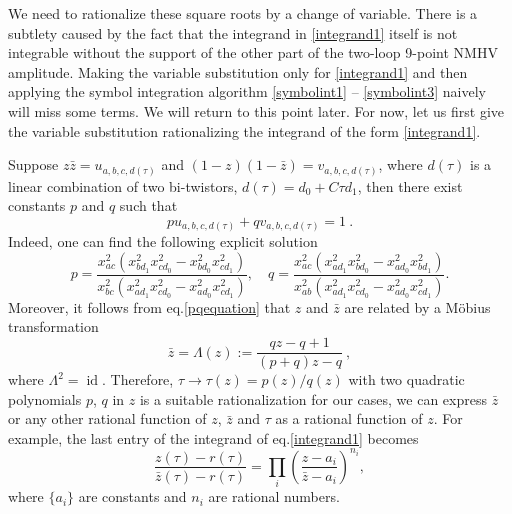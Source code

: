 \documentclass[a4paper,12pt]{article}
\begin{document}
We need to rationalize these square roots by a change of variable. There is a subtlety caused by the fact that the integrand in \eqref{integrand1} itself is not integrable without the support of the other part of the two-loop 9-point NMHV amplitude. Making the variable substitution only for \eqref{integrand1} and then applying the symbol integration algorithm \eqref{symbolint1} -- \eqref{symbolint3} naively will miss some terms. We will return to this point later. For now, let us first give the variable substitution rationalizing the integrand of the form \eqref{integrand1}.

Suppose $z\bar z=u_{a,b,c,d(\tau)}$ and $(1-z)(1-\bar z)=v_{a,b,c,d(\tau)}$, where $d(\tau)$ is a linear combination of two bi-twistors, $d(\tau)=d_0+C\tau d_1$, then there exist constants $p$ and $q$ such that
\begin{equation}
pu_{a,b,c,d(\tau)}+qv_{a,b,c,d(\tau)}=1 \:. \label{pqequation}
\end{equation}
Indeed, one can find the following explicit solution
\[
p=\frac{x_{ac}^2 (x_{bd_1}^2 x_{cd_0}^2- x_{bd_0}^2 x_{cd_1}^2)}{x_{bc}^2(x_{ad_1}^2  x_{cd_0}^2-x_{ad_0}^2  x_{cd_1}^2)},\quad q=\frac{x_{ac}^2(x_{ad_1}^2 x_{bd_0}^2-x_{ad_0}^2 x_{bd_1}^2)}{x_{ab}^2 (x_{ad_1}^2 x_{cd_0}^2-x_{ad_0}^2  x_{cd_1}^2)}.
\]
Moreover, it follows from eq.\eqref{pqequation} that $z$ and $\bar{z}$ are related by a M\"obius transformation 
\[
\bar z=\Lambda(z):=\frac{q z-q+1}{(p +q) z-q} \:,
\]
where $\Lambda^2=\operatorname{id}$. Therefore, $\tau\to \tau(z)=p(z)/q(z)$ with two quadratic polynomials $p$, $q$ in $z$ is a suitable rationalization for our cases, we can express $\bar z$ or any other rational function of $z$, $\bar z$ and $\tau$ as a rational function of $z$. For example, the last entry of the integrand of eq.\eqref{integrand1} becomes
\[
\frac{z(\tau)-r(\tau)}{\bar z(\tau)-r(\tau)}
=\prod_i \left(\frac{z-a_i}{\bar z-a_i}\right)^{n_i},
\]
where $\{a_i\}$ are constants and $n_i$ are rational numbers.
\end{document}
